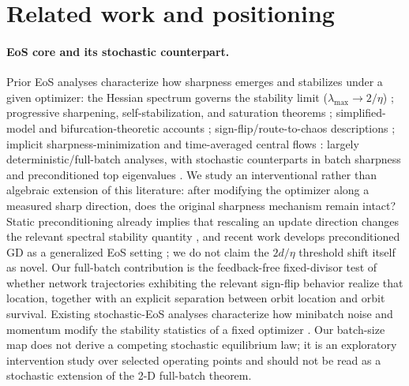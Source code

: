\documentclass{article}
\theoremstyle{plain}
\theoremstyle{definition}
\theoremstyle{remark}
\newcommand{\lmax}{\lambda_{\max}}
\begin{document}
\section{Related work and positioning}
\label{sec:related}
\paragraph{EoS core and its stochastic counterpart.} Prior EoS
analyses characterize how sharpness emerges and stabilizes under a
given optimizer: the Hessian spectrum governs the stability limit
($\lmax\!\to\!2/\eta$) \citep{lewkowycz2020catapult,cohen2021eos};
progressive sharpening, self-stabilization, and saturation theorems
\citep{li2022sharpness,damian2023selfstab,agarwala2022second};
simplified-model and bifurcation-theoretic accounts
\citep{chen2023beyond,ahn2023threshold,song2023trajectory};
sign-flip/route-to-chaos descriptions
\citep{kalra2023phase,kalra2025universal}; implicit
sharpness-minimization \citep{arora2022understanding} and
time-averaged central flows \citep{cohen2025central}: largely
deterministic/full-batch analyses, with stochastic counterparts in
batch sharpness \citep{andreyev2024eoss,andreyev2026momentum} and
preconditioned top eigenvalues \citep{cohen2022adaptive}. We study an
interventional rather than algebraic extension of this literature:
after modifying the optimizer along a measured sharp direction, does
the original sharpness mechanism remain intact? Static
preconditioning already implies that rescaling an update direction
changes the relevant spectral stability quantity
\citep{cohen2022adaptive}, and recent work develops preconditioned
GD as a generalized EoS setting \citep{nonEuclidean2026eos}; we do
not claim the $2d/\eta$ threshold shift itself as novel. Our
full-batch contribution is the feedback-free fixed-divisor test of
whether network trajectories exhibiting the relevant sign-flip
behavior realize that location, together with an explicit separation
between orbit location and orbit survival. Existing stochastic-EoS
analyses characterize how minibatch noise and momentum modify the
stability statistics of a fixed optimizer
\citep{andreyev2024eoss,andreyev2026momentum}. Our batch-size map
does not derive a competing stochastic equilibrium law; it is an
exploratory intervention study over selected operating points and
should not be read as a stochastic extension of the 2-D full-batch
theorem.
\end{document}
